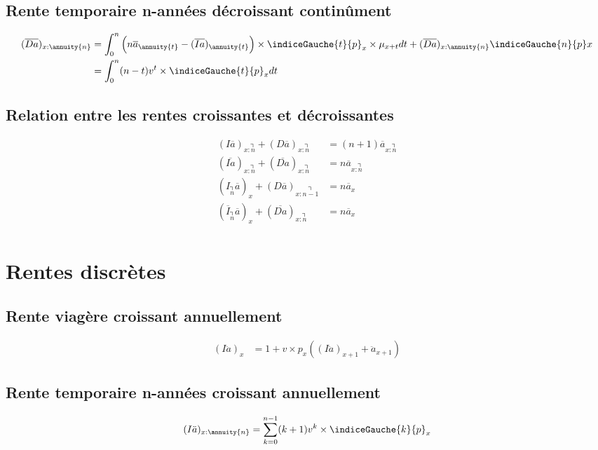 \subsection{Rente temporaire n-années décroissant continûment}
\begin{align*}
(\overline{Da})_{x:\annuity{n}} &= \int_{0}^{n}\Big( n \overline{a}_{\annuity{t}} - (\overline{Ia})_{\annuity{t}} \Big) \times \indiceGauche{t}{p}_x \times \mu_{x+t}dt + (\overline{Da})_{x:\annuity{n}} \indiceGauche{n}{p}x \\
&=  \int_{0}^{n} (n-t) v^t \times \indiceGauche{t}{p}_x dt\\
\end{align*}

\subsection{Relation entre les rentes croissantes et décroissantes}
\begin{align*}
(I\overline{a})_{x:\annuity{n}}  + (D\overline{a})_{x:\annuity{n}}  &= (n+1) \overline{a}_{x:\annuity{n}} \\
(\overline{Ia})_{x:\annuity{n}}  + (\overline{Da})_{x:\annuity{n}}  &= n \overline{a}_{x:\annuity{n}} \\
(I_{\annuity{n}}\overline{a})_{x}  + (D\overline{a})_{x:\annuity{n-1}}  &= n\overline{a}_{x} \\
(\overline{I}_{\annuity{n}}\overline{a})_{x}  + (\overline{Da})_{x:\annuity{n}}  &= n\overline{a}_{x} \\
\end{align*}

\section{Rentes discrètes}

\subsection{Rente viagère croissant annuellement}
\begin{align*}
(I\ddot{a})_x &= 1 + v \times p_x ( (I\ddot{a})_{x+1} + \ddot{a}_{x+1}  )
\end{align*}

\subsection{Rente temporaire n-années croissant annuellement}
\begin{align*}
(I\ddot{a})_{x:\annuity{n}} &= \sum_{k=0}^{n -1} (k+1) v^k \times \indiceGauche{k}{p}_{x} \\
\end{align*}

